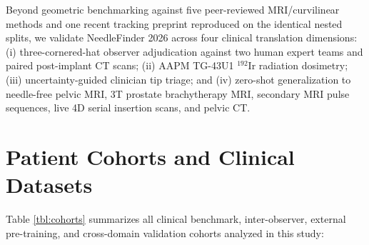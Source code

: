 \documentclass[
  11pt,
]{article}
\begin{document}
Beyond geometric benchmarking against five peer-reviewed MRI/curvilinear
methods and one recent tracking preprint reproduced on the identical
nested splits, we validate NeedleFinder 2026 across four clinical
translation dimensions: (i) three-cornered-hat observer adjudication
against two human expert teams and paired post-implant CT scans; (ii)
AAPM TG-43U1 \(^{192}\text{Ir}\) radiation dosimetry; (iii)
uncertainty-guided clinician tip triage; and (iv) zero-shot
generalization to needle-free pelvic MRI, 3T prostate brachytherapy MRI,
secondary MRI pulse sequences, live 4D serial insertion scans, and
pelvic CT.

\FloatBarrier

\section{Patient Cohorts and Clinical
Datasets}\label{patient-cohorts-and-clinical-datasets}



Table \ref{tbl:cohorts} summarizes all clinical benchmark,
inter-observer, external pre-training, and cross-domain validation
cohorts analyzed in this study:
\end{document}
